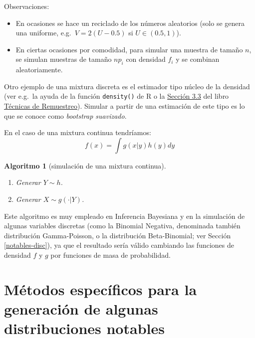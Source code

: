 \documentclass[
]{book}
\theoremstyle{break}
\newtheorem{conjecture}{Algoritmo}[chapter]
\theoremstyle{nonumberplain}
\begin{document}
Observaciones:

\begin{itemize}
\item
  En ocasiones se hace un reciclado de los números aleatorios
  (solo se genera una uniforme, e.g.~\(V=2(U-0.5)\) si
  \(U\in (0.5,1)\)).
\item
  En ciertas ocasiones por comodidad, para simular una muestra de
  tamaño \(n\), se simulan muestras de tamaño \(np_{i}\) con densidad
  \(f_{i}\) y se combinan aleatoriamente.
\end{itemize}

Otro ejemplo de una mixtura discreta es el estimador tipo núcleo de la densidad (ver e.g.~la ayuda de la función \texttt{density()} de R o la \href{https://rubenfcasal.github.io/book_remuestreo/modunif-boot-suav.html}{Sección 3.3} del libro \href{https://rubenfcasal.github.io/book_remuestreo}{Técnicas de Remuestreo}).
Simular a partir de una estimación de este tipo es lo que se conoce como \emph{bootstrap suavizado}.

En el caso de una mixtura continua tendríamos:
\[f(x)=\int g(x|y)h(y)dy\]

\begin{conjecture}[simulación de una mixtura continua]
\protect\hypertarget{cnj:mixtura-continua}{}\label{cnj:mixtura-continua}

\begin{enumerate}
\def\labelenumi{\arabic{enumi}.}
\item
  Generar \(Y\sim h\).
\item
  Generar \(X\sim g(\cdot |Y)\).
\end{enumerate}

\end{conjecture}

Este algoritmo es muy empleado en Inferencia Bayesiana y en la simulación de algunas variables discretas (como la Binomial Negativa, denominada también distribución Gamma-Poisson, o la distribución Beta-Binomial; ver Sección \ref{notables-disc}),
ya que el resultado sería válido cambiando las funciones de densidad \(f\) y \(g\) por funciones de masa de probabilidad.

\hypertarget{notables-cont}{%
\section{Métodos específicos para la generación de algunas distribuciones notables}\label{notables-cont}}
\end{document}
